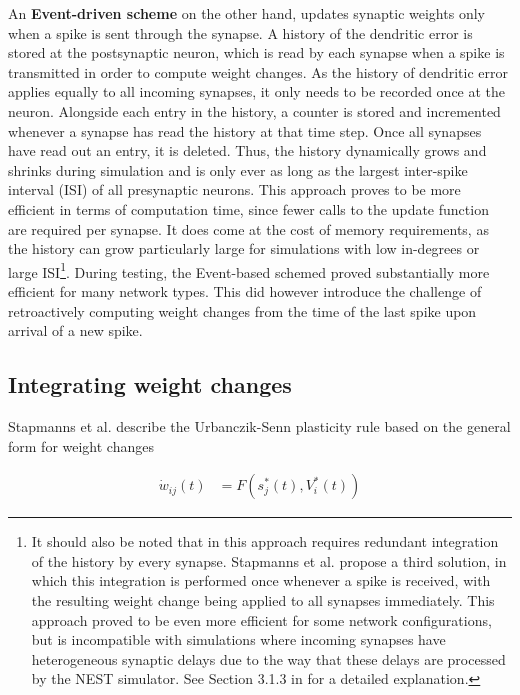 An \textbf{Event-driven scheme} on the other hand, updates synaptic weights only when a spike is sent through the
synapse. A history of the dendritic error is stored at the postsynaptic neuron, which is read by each synapse when a
spike is transmitted in order to compute weight changes. As the history of dendritic error applies equally to all
incoming synapses, it only needs to be recorded once at the neuron. Alongside each entry in the history, a counter is
stored and incremented whenever a synapse has read the history at that time step. Once all synapses have read out an
entry, it is deleted. Thus, the history dynamically grows and shrinks during simulation and is only ever as long as the
largest inter-spike interval (ISI) of all presynaptic neurons. This approach proves to be more efficient in terms of
computation time, since fewer calls to the update function are required per synapse. It does come at the cost of memory
requirements, as the history can grow particularly large for simulations with low in-degrees or large ISI\footnote{It
should also be noted that in this approach requires redundant integration of the history by every synapse. Stapmanns et
al. propose a third solution, in which this integration is performed once whenever a spike is received, with the
resulting weight change being applied to all synapses immediately. This approach proved to be even more efficient for
some network configurations, but is incompatible with simulations where incoming synapses have heterogeneous synaptic
delays due to the way that these delays are processed by the NEST simulator. See Section 3.1.3 in \cite{Stapmanns2021}
for a detailed explanation.}. During testing, the Event-based schemed proved substantially more efficient for many
network types. This did however introduce the challenge of retroactively computing weight changes from the time of the
last spike upon arrival of a new spike. \newline


\subsection{Integrating weight changes}


Stapmanns et al. describe the Urbanczik-Senn plasticity rule based on the general form for weight changes

\begin{align}
  \dot{w}_{ij}(t) & = F(s_j^\ast (t), V_i^\ast (t)) \label{eq-delta-w-spiking}
\end{align}

